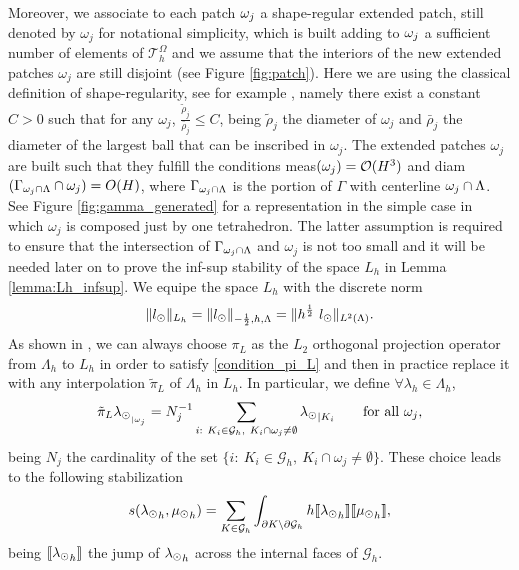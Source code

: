 Moreover, we associate to each patch $\omega _j$ a shape-regular extended patch, still denoted by $\omega_j$ for notational simplicity, which is built adding to $\omega _j$ a sufficient number of elements of $\mathcal{T}_h^{\Omega}$ and we assume that the interiors of the new extended patches $\omega _j$ are still disjoint (see Figure \ref{fig:patch}). Here we are using the classical definition of shape-regularity, see for example \cite{MR2050138}, namely there exist a constant $C>0$ such that for any $\omega_j$, $\frac{\tilde{\rho}_j}{\bar{\rho}_j}\leq C$, being $\tilde{\rho}_j$ the diameter of $\omega_j$ and $\bar{\rho}_j$ the diameter of the largest ball that can be inscribed in $\omega_j$. The extended patches $\omega _j$ are built such that they fulfill the conditions meas$(\omega _j)=\mathcal{O}(H^3)$ and diam$(\Gamma_{\omega _j\cap \Lambda}\cap \omega_j)=O(H)$, where $\Gamma_{\omega _j\cap \Lambda}$ is the portion of $\Gamma$ with centerline $\omega _j\cap \Lambda$. See Figure \ref{fig:gamma_generated} for a representation in the simple case in which $\omega _j$ is composed just by one tetrahedron. The latter assumption is required to ensure that the intersection of $\Gamma_{\omega _j\cap \Lambda}$ and $\omega_j$ is not too small and it will be needed later on to prove the inf-sup stability of the space $L_h$ in Lemma \ref{lemma:Lh_infsup}. We equipe the space $L_h$ with the discrete norm 
\begin{equation*}
\|l_{\odot} \|_{L_h} = \|l_{\odot} \|_{-\frac 12, h, \Lambda} = \|h^{\frac 12} \  l_{\odot} \|_{L^2(\Lambda)}.
\end{equation*}
As shown in \cite[Section III]{burman2014}, we can always choose $\pi_L$ as the $L_2$ orthogonal projection operator from $\Lambda_h$ to $L_h$ in order to satisfy \eqref{condition_pi_L} and then in practice replace it with any interpolation $\tilde{\pi}_L$ of $\Lambda_h$ in $L_h$. In particular, we define $\forall \lambda_h \in \Lambda_h$,
\begin{equation*}
\tilde{\pi}_L {\lambda_{\odot}}_{ _{|\omega _j}} = N_j^{-1} \sum_{\substack{i: \ K_i \in \mathcal{G}_h, \  K_i \cap \omega_j \neq \emptyset}} {\lambda_{\odot}}_{|K_i} \qquad \text{for all $\omega_j$,} 
\end{equation*}
being $N_j$ the cardinality of the set $\{i: \ K_i \in \mathcal{G}_h, \  K_i \cap \omega_j \neq \emptyset\}$. These choice leads to the following stabilization 
\begin{equation*}
s({\lambda_{\odot}}_h, {\mu_{\odot}}_h)= \sum _{K\in \mathcal{G}_{h}} \int_{\partial K\setminus \partial \mathcal{G}_{h}} h \llbracket {\lambda_{\odot}}_h \rrbracket \llbracket {\mu_{\odot}}_h \rrbracket,
\end{equation*}
being $\llbracket {\lambda_{\odot}}_h \rrbracket$ the jump of ${\lambda_{\odot}}_h$ across the internal faces of $\mathcal{G}_h$.

